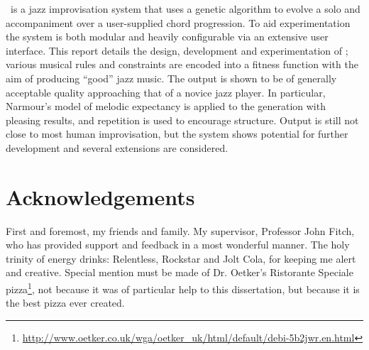 \newpage
{}
\newpage
\abstract
\jg\ is a jazz improvisation system that uses a genetic algorithm to evolve a solo
and accompaniment over a user-supplied chord progression. To aid experimentation
the system is both modular and heavily configurable via an extensive user interface.
This report details the design, development and experimentation of \jg; various
musical rules and constraints are encoded into a fitness function with the aim of
producing ``good'' jazz music. The output is shown to be of generally acceptable quality
approaching that of a novice jazz player. In particular, Narmour's model of melodic
expectancy is applied to the generation with pleasing results, and repetition is
used to encourage structure. Output is still not close to most human improvisation, but
the system shows potential for further development and several extensions are
considered.
\newpage
\tableofcontents
\newpage

\chapter*{Acknowledgements}
First and foremost, my friends and family. My supervisor, Professor John Fitch,
who has provided support and feedback in a most wonderful manner. The holy
trinity of energy drinks: Relentless, Rockstar and Jolt Cola, for keeping me
alert and creative. Special mention must be made of Dr. Oetker's Ristorante
Speciale pizza\footnote{\url{http://www.oetker.co.uk/wga/oetker_uk/html/default/debi-5b2jwr.en.html}},
not because it was of particular help to this dissertation,
but because it is the best pizza ever created.
\newpage